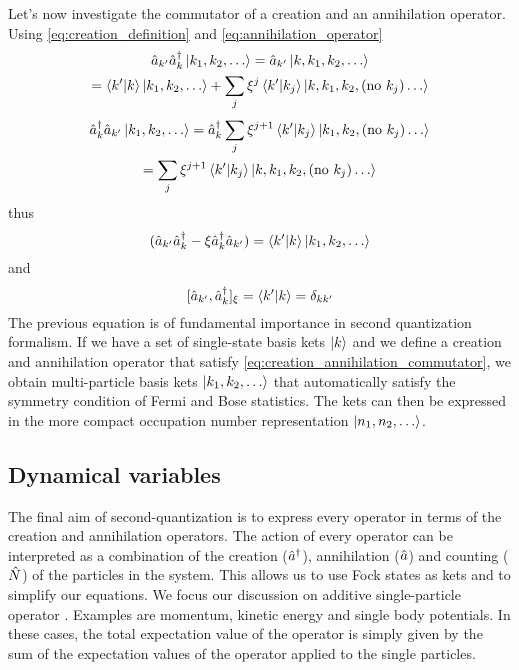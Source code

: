 Let's now investigate the commutator of a creation and an annihilation operator. Using \cref{eq:creation_definition} and  \cref{eq:annihilation_operator}
\begin{multline}
    \hat{a}_{k'}\hat{a}^\dagger_k \ket{k_1, k_2, \dots}
    = \hat{a}_{k'} \ket{k,k_1, k_2, \dots}
    \\= \braket{k'}{k} \ket{k_1, k_2, \dots}
    +    \sum_{j} \xi^{j} \braket{k'}{k_j} \ket{k,k_1, k_2, (\text{no } k_j) \dots}
\end{multline}
\begin{multline}
    \hat{a}^\dagger_k\hat{a}_{k'} \ket{k_1, k_2, \dots}
    = \hat{a}^\dagger_k \sum_{j} \xi^{j+1} \braket{k'}{k_j} \ket{k_1, k_2, (\text{no } k_j) \dots}
    \\= \sum_{j} \xi^{j+1} \braket{k'}{k_j} \ket{k,k_1, k_2, (\text{no } k_j) \dots}
\end{multline}
thus
\begin{equation}
    (\hat{a}_{k'}\hat{a}^\dagger_k -\xi  \hat{a}^\dagger_k\hat{a}_{k'}) = \braket{k'}{k} \ket{k_1, k_2, \dots}
\end{equation}
and
\begin{equation} \label{eq:creation_annihilation_commutator}
    [\hat{a}_{k'}, \hat{a}^\dagger_k]_\xi = \braket{k'}{k} = \delta_{kk'}
\end{equation}
The previous equation is of fundamental importance in second quantization formalism. If we have a set of single-state basis kets $\ket{k}$ and we define a creation and annihilation operator that satisfy \cref{eq:creation_annihilation_commutator}, we obtain multi-particle basis kets $\ket{k_1, k_2, \dots}$ that automatically satisfy the symmetry condition of Fermi and Bose statistics. The kets can then be expressed in the more compact occupation number representation $\ket{n_{1}, n_{2}, \dots}$.

\subsection{Dynamical variables}
The final aim of second-quantization is to express every operator in terms of the creation and annihilation operators. The action of every operator can be interpreted as a combination of the creation ($\hat{a}^\dagger$), annihilation ($\hat{a}$) and counting ($\hat{N}$) of the particles in the system. This allows us to use Fock states as kets and to simplify our equations.
We focus our discussion on additive single-particle operator \cite{sakurai2020}. Examples are momentum, kinetic energy and single body potentials. In these cases, the total expectation value of the operator is simply given by the sum of the expectation values of the operator applied to the single particles.

